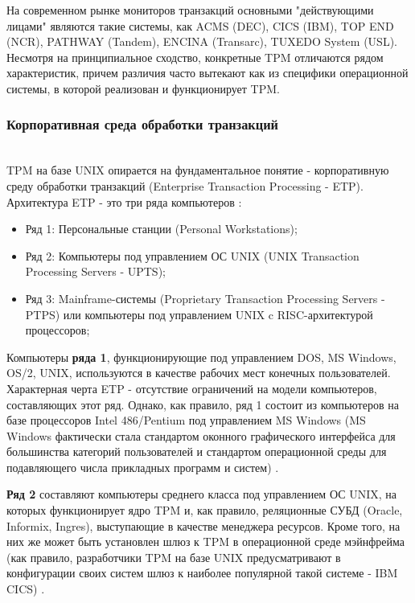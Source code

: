 На современном рынке мониторов транзакций основными "действующими лицами" являются такие системы,
как ACMS (DEC), CICS (IBM), TOP END (NCR), PATHWAY (Tandem), ENCINA (Transarc), TUXEDO System (USL).
Несмотря на принципиальное сходство, конкретные TPM отличаются рядом характеристик, причем
различия часто вытекают как из специфики операционной системы, в которой реализован и функционирует TPM.

\subsubsection{Корпоративная среда обработки транзакций}~\\

TPM на базе UNIX опирается на фундаментальное понятие - корпоративную среду обработки транзакций
(Enterprise Transaction Processing - ETP). Архитектура ETP - это три ряда компьютеров \autocite{TransactionMonitors}:
\begin{itemize}
    \item Ряд 1: Персональные станции (Personal Workstations);
    \item Ряд 2: Компьютеры под управлением ОС UNIX (UNIX Transaction Processing Servers - UPTS);
    \item Ряд 3: Mainframe-системы (Proprietary Transaction Processing Servers - PTPS)
    или компьютеры под управлением UNIX c RISC-архитектурой процессоров;
\end{itemize}

Компьютеры \textbf{ряда 1}, функционирующие под управлением DOS, MS Windows, OS/2, UNIX, используются в качестве рабочих мест
конечных пользователей. Характерная черта ETP - отсутствие ограничений на модели компьютеров,
составляющих этот ряд. Однако, как правило, ряд 1 состоит из компьютеров на базе процессоров Intel
486/Pentium под управлением MS Windows (MS Windows фактически стала стандартом оконного графического интерфейса
для большинства категорий пользователей и стандартом операционной среды для подавляющего числа прикладных программ и систем) \autocite{TransactionMonitors}.

\textbf{Ряд 2} составляют компьютеры среднего класса под управлением ОС UNIX,
на которых функционирует ядро TPM и, как правило, реляционные СУБД (Oracle, Informix, Ingres),
выступающие в качестве менеджера ресурсов. Кроме того, на них же может быть установлен шлюз к TPM в
операционной среде мэйнфрейма (как правило, разработчики TPM на базе UNIX предусматривают в конфигурации своих
систем шлюз к наиболее популярной такой системе - IBM CICS) \autocite{TransactionMonitors}.

